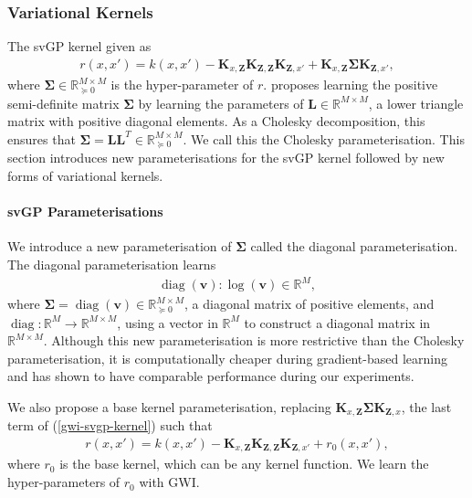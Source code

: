 \documentclass{article}
\newcommand{\diag}{\operatorname{diag}}
\numberwithin{equation}{section}
\begin{document}
\subsubsection{Variational Kernels}\label{variational-kernels}
The svGP kernel given as
\begin{align}
    r(x, x') = k(x, x') - \mathbf{K}_{x, \mathbf{Z}} \mathbf{K}_{\mathbf{Z}, \mathbf{Z}} \mathbf{K}_{\mathbf{Z}, x'} + \mathbf{K}_{x, \mathbf{Z}} \mathbf{\Sigma} \mathbf{K}_{\mathbf{Z}, x'},
    \label{gwi-svgp-kernel}
\end{align}
where $\mathbf{\Sigma} \in \mathbb{R}^{M \times M}_{\succcurlyeq 0}$ is the hyper-parameter of $r$. 
\cite{wild2022generalized} proposes learning the positive semi-definite matrix $\mathbf{\Sigma}$ by learning the parameters of $\mathbf{L} \in \mathbb{R}^{M \times M}$, a lower triangle matrix with positive diagonal elements.
As a Cholesky decomposition, this ensures that $\mathbf{\Sigma} = \mathbf{L}\mathbf{L}^T \in \mathbb{R}^{M \times M}_{\succcurlyeq 0}$. 
We call this the Cholesky parameterisation. 
This section introduces new parameterisations for the svGP kernel followed by new forms of variational kernels.

\paragraph{svGP Parameterisations}
We introduce a new parameterisation of $\mathbf{\Sigma}$ called the diagonal parameterisation. The diagonal parameterisation learns
\begin{align}
    \diag(\mathbf{v}): \log(\mathbf{v}) \in \mathbb{R}^M,
\end{align}
where $\mathbf{\Sigma} = \diag(\mathbf{v}) \in \mathbb{R}^{M \times M}_{\succcurlyeq 0}$, a diagonal matrix of positive elements, and $\diag: \mathbb{R}^M \rightarrow \mathbb{R}^{M \times M}$, using a vector in $\mathbb{R}^M$ to construct a diagonal matrix in $\mathbb{R}^{M \times M}$.
Although this new parameterisation is more restrictive than the Cholesky parameterisation, it is computationally cheaper during gradient-based learning and has shown to have comparable performance during our experiments.

We also propose a base kernel parameterisation, replacing $\mathbf{K}_{x, \mathbf{Z}} \mathbf{\Sigma} \mathbf{K}_{\mathbf{Z}, x}$, the last term of (\ref{gwi-svgp-kernel}) such that
\begin{align}
    r(x, x') = k(x, x') - \mathbf{K}_{x, \mathbf{Z}} \mathbf{K}_{\mathbf{Z}, \mathbf{Z}} \mathbf{K}_{\mathbf{Z}, x'} + r_0(x, x'),
\end{align}
where $r_0$ is the base kernel, which can be any kernel function. We learn the hyper-parameters of $r_0$ with GWI.
\end{document}
